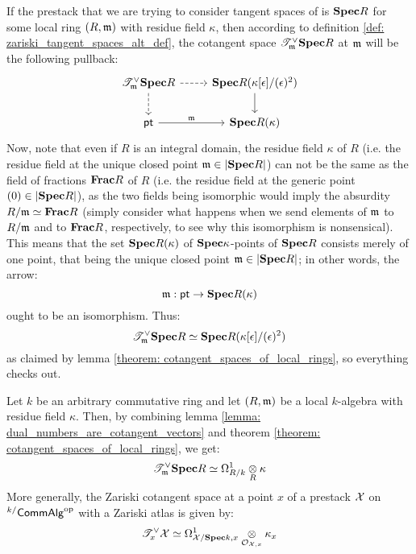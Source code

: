            \begin{remark}
                If the prestack that we are trying to consider tangent spaces of is $\mathbf{Spec} R$ for some local ring $(R, \mathfrak{m})$ with residue field $\kappa$, then according to definition \ref{def: zariski_tangent_spaces_alt_def}, the cotangent space $\mathscr{T}^{\vee}_{\mathfrak{m}}\mathbf{Spec} R$ at $\mathfrak{m}$ will be the following pullback:
                    $$
                        \begin{tikzcd}
                        	{\T^{\vee}_{\m}\Spec R} & {\Spec R(\kappa[\e]/(\e)^2)} \\
                        	\pt & {\Spec R(\kappa)}
                        	\arrow[from=1-2, to=2-2]
                        	\arrow["\m", from=2-1, to=2-2]
                        	\arrow[dashed, from=1-1, to=2-1]
                        	\arrow[dashed, from=1-1, to=1-2]
                        \end{tikzcd}
                    $$
                Now, note that even if $R$ is an integral domain, the residue field $\kappa$ of $R$ (i.e. the residue field at the unique closed point $\mathfrak{m} \in |\mathbf{Spec} R|$) can not be the same as the field of fractions $\mathbf{Frac} R$ of $R$ (i.e. the residue field at the generic point $(0) \in |\mathbf{Spec} R|$), as the two fields being isomorphic would imply the absurdity $R/\mathfrak{m} \simeq \mathbf{Frac} R$ (simply consider what happens when we send elements of $\mathfrak{m}$ to $R/\mathfrak{m}$ and to $\mathbf{Frac} R$, respectively, to see why this isomorphism is nonsensical). This means that the set $\mathbf{Spec} R(\kappa)$ of $\mathbf{Spec} \kappa$-points of $\mathbf{Spec} R$ consists merely of one point, that being the unique closed point $\mathfrak{m} \in |\mathbf{Spec} R|$; in other words, the arrow:
                    $$\mathfrak{m}: \mathsf{pt} \to \mathbf{Spec} R(\kappa)$$
                ought to be an isomorphism. Thus:
                    $$\mathscr{T}^{\vee}_{\mathfrak{m}}\mathbf{Spec} R \simeq \mathbf{Spec} R(\kappa[\epsilon]/(\epsilon)^2)$$
                as claimed by lemma \ref{theorem: cotangent_spaces_of_local_rings}, so everything checks out.
            \end{remark}
            \begin{remark} 
                Let $k$ be an arbitrary commutative ring and let $(R, \mathfrak{m})$ be a local $k$-algebra with residue field $\kappa$. Then, by combining lemma \ref{lemma: dual_numbers_are_cotangent_vectors} and theorem \ref{theorem: cotangent_spaces_of_local_rings}, we get:
                    $$\T^{\vee}_{\m}\Spec R \cong \Omega^1_{R/k} \tensor_R \kappa$$
                More generally, the Zariski cotangent space at a point $x$ of a prestack $\mathcal{X}$ on ${}^{k/}\mathsf{Comm}\mathsf{Alg}^{\mathrm{op}}$ with a Zariski atlas is given by:
                    $$\T^{\vee}_x\calX \cong \Omega^1_{\calX/\Spec k, x} \tensor_{\calO_{\calX, x}} \kappa_x$$
            \end{remark}
            
